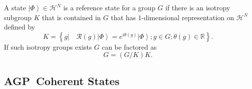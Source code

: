 \documentclass[aps,preprint]{revtex4}%
\begin{document}
A state $\left\vert \Phi\right\rangle \in\mathcal{H}^{N}$ is a reference state
for a group $G$ if there is an isotropy subgroup $K$ that is contained in $G$
that has $1$-dimensional representation on $\mathcal{H}^{N}$ defined by
\begin{equation}
K=\left\{  \left.  g\right\vert \quad\mathcal{R}\left(  g\right)  \left\vert
\Phi\right\rangle =e^{i\theta\left(  g\right)  }\left\vert \Phi\right\rangle
;g\in G;\theta\left(  g\right)  \in\mathbb{R}\right\}  . \label{subgpcon}%
\end{equation}
If such isotropy groups exists $G$ can be factored as%
\begin{equation}
G=\left(  G/K\right)  K.
\end{equation}


\subsection{AGP\ Coherent States}
\end{document}
